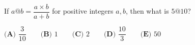 If $a@b=\dfrac{a\times b}{a+b}$ for positive integers $a,b$, then what is $5@10$?

$\textbf{(A) }\dfrac{3}{10}\qquad\textbf{(B) }1\qquad\textbf{(C) }2\qquad\textbf{(D) }\dfrac{10}{3}\qquad\textbf{(E) }50$
